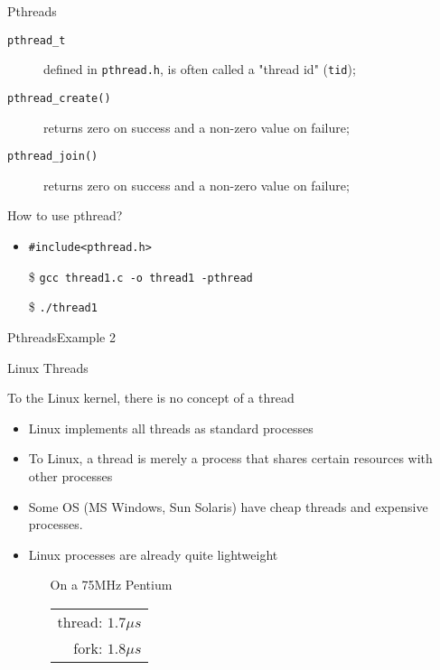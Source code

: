 \begin{frame}{Pthreads}
  \begin{description}
  \item[\texttt{pthread\_t}] defined in \texttt{pthread.h}, is often called a "thread id"
    (\texttt{tid});
  \item[\texttt{pthread\_create()}] returns zero on success and a non-zero value on failure;
  \item[\texttt{pthread\_join()}] returns zero on success and a non-zero value on failure;
  \end{description}
  \begin{block}{How to use pthread?}
    \begin{itemize}
    \item \texttt{\#include<pthread.h>}
    \item[\$] \texttt{gcc thread1.c -o thread1 -pthread}
    \item[\$] \texttt{./thread1}
    \end{itemize}
  \end{block}
\end{frame}

\begin{frame}{Pthreads}{Example 2}
  \begin{center}
  \end{center}
\end{frame}

\begin{frame}{Linux Threads}
  \begin{block}{To the Linux kernel, there is no concept of a thread}
    \begin{itemize}
    \item Linux implements all threads as standard processes
    \item To Linux, a thread is merely a process that shares certain resources with other
      processes
    \item Some OS (MS Windows, Sun Solaris) have cheap threads and expensive processes.
    \item Linux processes are already quite lightweight
      \begin{itemize}
      \item[] On a 75MHz Pentium
        \begin{tabular}{r}
          thread: $1.7\mu{}s$\\
          fork: $1.8\mu{}s$
        \end{tabular}
      \end{itemize}
    \end{itemize}
  \end{block}
\end{frame}

